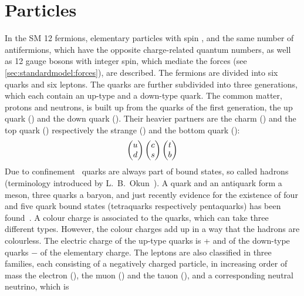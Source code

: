 
\section{Particles}
\label{sec:standardmodel:particles}

In the SM 12 fermions, elementary particles with spin , and the
same number of antifermions, which have the opposite charge-related quantum
numbers, as well as 12 gauge bosons with integer spin, which mediate the
forces (see \cref{sec:standardmodel:forces}), are described. The fermions are
divided into six quarks and six leptons. The quarks are further subdivided
into three generations, which each contain an up-type and a down-type quark.
The common matter, protons and neutrons, is built up from the quarks of the
first generation, the up quark (\uquark) and the down quark (\dquark). Their
heavier partners are the charm (\cquark) and the top quark (\tquark)
respectively the strange (\squark) and the bottom quark (\bquark):
\begin{align}
\begin{pmatrix}
{\ensuremath{u}} \\ {d}
\end{pmatrix}
\begin{pmatrix}
{\ensuremath{c}} \\ {s}
\end{pmatrix}
\begin{pmatrix}
{\ensuremath{t}}	\\ {b}
\end{pmatrix}
\end{align}
Due to confinement~\cite{Confinement} quarks are always part of bound states,
so called hadrons (terminology introduced by L.~B.~Okun~\cite{Okun:1962kca}).
A quark and an antiquark form a meson, three quarks a baryon, and just
recently evidence for the existence of four and five quark bound states
(tetraquarks respectively pentaquarks) has been
found~\cite{LHCb-PAPER-2016-018,*LHCb-PAPER-2016-019,LHCb-PAPER-2015-029,LHCb-PAPER-2016-015}.
A colour charge is associated to the quarks, which can take three different
types. However, the colour charges add up in a way that the hadrons are
colourless. The electric charge of the up-type quarks is + and of
the down-type quarks $-$ of the elementary charge. The leptons are
also classified in three families, each consisting of a negatively charged
particle, in increasing order of mass the electron (\electron), the muon
(\muon) and the tauon (\tauon), and a corresponding neutral neutrino, which is
